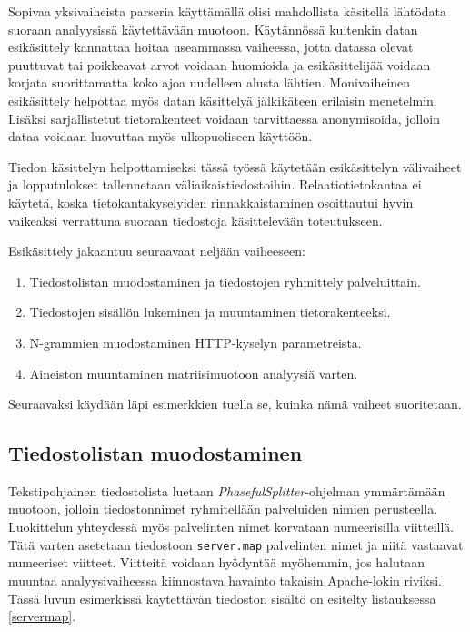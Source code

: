 Sopivaa yksivaiheista parseria käyttämällä olisi mahdollista käsitellä
lähtödata suoraan analyysissä käytettävään muotoon. Käytännössä
kuitenkin datan esikäsittely kannattaa hoitaa useammassa vaiheessa,
jotta datassa olevat puuttuvat tai poikkeavat arvot voidaan huomioida
ja esikäsittelijää voidaan korjata suorittamatta koko ajoa uudelleen
alusta lähtien. Monivaiheinen esikäsittely helpottaa myös datan
käsittelyä jälkikäteen erilaisin menetelmin. Lisäksi sarjallistetut
tietorakenteet voidaan tarvittaessa anonymisoida, jolloin dataa
voidaan luovuttaa myös ulkopuoliseen käyttöön.

Tiedon käsittelyn helpottamiseksi tässä työssä käytetään esikäsittelyn
välivaiheet ja lopputulokset tallennetaan väliaikaistiedostoihin.
Relaatiotietokantaa ei käytetä, koska tietokantakyselyiden
rinnakkaistaminen osoittautui hyvin vaikeaksi verrattuna suoraan
tiedostoja käsittelevään toteutukseen.

Esikäsittely jakaantuu seuraavaat neljään vaiheeseen:

\begin{enumerate}
\item Tiedostolistan muodostaminen ja tiedostojen ryhmittely palveluittain.
\item Tiedostojen sisällön lukeminen ja muuntaminen tietorakenteeksi.
\item N-grammien muodostaminen HTTP-kyselyn parametreista.
\item Aineiston muuntaminen matriisimuotoon analyysiä varten.
\end{enumerate}

Seuraavaksi käydään läpi esimerkkien tuella se, kuinka nämä vaiheet
suoritetaan.

\subsection{Tiedostolistan muodostaminen}
\label{sec:tiedostolista}

Tekstipohjainen tiedostolista luetaan
\textit{PhasefulSplitter}-ohjelman ymmärtämään muotoon, jolloin
tiedostonnimet ryhmitellään palveluiden nimien perusteella. 
Luokittelun yhteydessä myös palvelinten nimet korvataan numeerisilla
viitteillä. Tätä varten asetetaan tiedostoon \texttt{server.map}
palvelinten nimet ja niitä vastaavat numeeriset viitteet. Viitteitä
voidaan hyödyntää myöhemmin, jos halutaan muuntaa analyysivaiheessa
kiinnostava havainto takaisin Apache-lokin riviksi. Tässä luvun
esimerkissä käytettävän tiedoston sisältö on esitelty listauksessa
\ref{servermap}.


